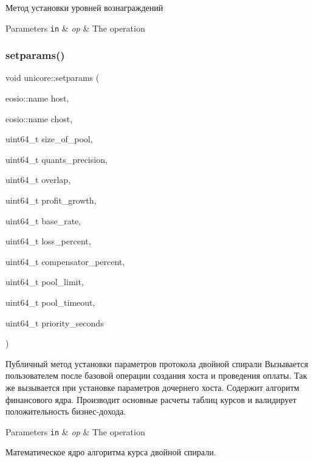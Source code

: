 Метод установки уровней вознаграждений 


\begin{DoxyParams}[1]{Parameters}
\mbox{\tt in}  & {\em op} & The operation \\
\hline
\end{DoxyParams}
\mbox{\label{classunicore_a8898e75bc9abe84fd78c15f9de3731f5}} 
\subsubsection{\texorpdfstring{setparams()}{setparams()}}
{\footnotesize\ttfamily void unicore\+::setparams (\begin{DoxyParamCaption}\item[{eosio\+::name}]{host,  }\item[{eosio\+::name}]{chost,  }\item[{uint64\+\_\+t}]{size\+\_\+of\+\_\+pool,  }\item[{uint64\+\_\+t}]{quants\+\_\+precision,  }\item[{uint64\+\_\+t}]{overlap,  }\item[{uint64\+\_\+t}]{profit\+\_\+growth,  }\item[{uint64\+\_\+t}]{base\+\_\+rate,  }\item[{uint64\+\_\+t}]{loss\+\_\+percent,  }\item[{uint64\+\_\+t}]{compensator\+\_\+percent,  }\item[{uint64\+\_\+t}]{pool\+\_\+limit,  }\item[{uint64\+\_\+t}]{pool\+\_\+timeout,  }\item[{uint64\+\_\+t}]{priority\+\_\+seconds }\end{DoxyParamCaption})}



Публичный метод установки параметров протокола двойной спирали Вызывается пользователем после базовой операции создания хоста и проведения оплаты. Так же вызывается при установке параметров дочернего хоста. Содержит алгоритм финансового ядра. Производит основные расчеты таблиц курсов и валидирует положительность бизнес-\/дохода. 


\begin{DoxyParams}[1]{Parameters}
\mbox{\tt in}  & {\em op} & The operation \\
\hline
\end{DoxyParams}
Математическое ядро алгоритма курса двойной спирали.

